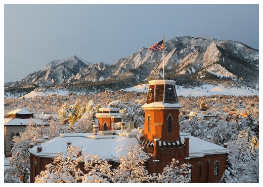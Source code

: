 \documentclass[mathserif,compress]{beamer}
\renewcommand\;{\,}
\begin{document}
\begin{frame}
\begin{center}
\begin{minipage}{0.49\linewidth}
\begin{itemize}
\begin{center}
\includegraphics[width=\linewidth]{Images/Boulder.jpg}
\end{center}
\end{itemize}
\end{minipage}
\end{center}
\end{frame}
\end{document}
